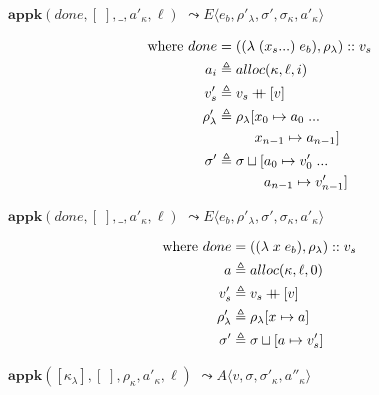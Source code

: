 \documentclass[12pt,draft]{article}
\newcommand\mdoubleplus{\ensuremath{\mathbin{+\mkern-9mu+}}}
\newcommand{\lamsyn}[2]{(\lambda\;(#1 ...)\;#2)}
\newcommand{\vararglamsyn}[2]{(\lambda\;#1\;#2)}
\begin{document}
\begin{multicols*}{2}
\vfill\null
\columnbreak


\begin{center}
  $\textbf{appk}(done, [\;], \_, a'_\kappa, \ell)$
  $\leadsto E\langle e_b , \rho'_\lambda , \sigma',\sigma_\kappa,a'_\kappa \rangle$
\end{center}
\vspace{-7mm}
\begin{align*}
  \text{where }
  done &= (\lamsyn{x_s}{e_b}, \rho_{\lambda}) :: v_s \\
  a_i &\triangleq alloc(\kappa, \ell, i) \\
  v'_s &\triangleq v_s \mdoubleplus [v] \\
  \rho'_{\lambda} &\triangleq \rho_{\lambda}[x_0 \mapsto a_0 \;... \\
       &\;\;\;\;\;\;\;\;\;\,x_{n-1} \mapsto a_{n-1}] \\
  \sigma' &\triangleq \sigma \sqcup [a_0 \mapsto v'_0\;...\\
       &\;\;\;\;\;\;\;\;\;\;\;\;a_{n-1} \mapsto v'_{n-1}]
\end{align*}
\begin{center}
  $\textbf{appk}(done, [\;], \_, a'_\kappa, \ell)$
  $\leadsto E\langle e_b, \rho'_\lambda , \sigma',\sigma_\kappa,a'_\kappa \rangle$
\end{center}
\vspace{-7mm}
\begin{align*}
  \text{where }
  done &= (\vararglamsyn{x}{e_b}, \rho_{\lambda}) :: v_s \\
  a &\triangleq alloc(\kappa, \ell, 0) \\
  v'_s &\triangleq v_s \mdoubleplus [v] \\
  \rho'_{\lambda} &\triangleq \rho_{\lambda}[x \mapsto a] \\
  \sigma' &\triangleq \sigma \sqcup [a \mapsto v'_s]
\end{align*}
\begin{center}
  $\textbf{appk}([\kappa_\lambda] , [\;] , \rho_\kappa , a'_\kappa, \ell)$
  $\leadsto A\langle v , \sigma , \sigma'_\kappa,a''_\kappa \rangle$
\end{center}
\vspace{-6mm}

\end{multicols*}
\end{document}

